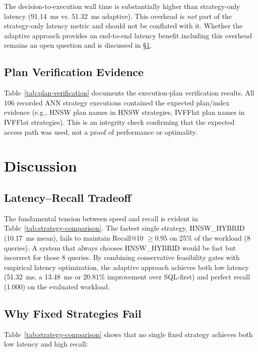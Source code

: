 \documentclass[10pt,twocolumn]{article}
\begin{document}
The decision-to-execution wall time is substantially higher than strategy-only latency (91.14~ms vs. 51.32~ms adaptive). This overhead is \emph{not} part of the strategy-only latency metric and should not be conflated with it. Whether the adaptive approach provides an end-to-end latency benefit including this overhead remains an open question and is discussed in \S\ref{sec:discussion}.



\subsection{Plan Verification Evidence}

Table~\ref{tab:plan-verification} documents the execution-plan verification results. All 106 recorded ANN strategy executions contained the expected plan/index evidence (e.g., HNSW plan names in HNSW strategies, IVFFlat plan names in IVFFlat strategies). This is an integrity check confirming that the expected access path was used, not a proof of performance or optimality.



\section{Discussion}
\label{sec:discussion}

\subsection{Latency--Recall Tradeoff}

The fundamental tension between speed and recall is evident in Table~\ref{tab:strategy-comparison}. The fastest single strategy, HNSW\_HYBRID (10.17~ms mean), fails to maintain Recall@10 $\geq 0.95$ on 25\% of the workload (8 queries). A system that always chooses HNSW\_HYBRID would be fast but incorrect for those 8 queries. By combining conservative feasibility gates with empirical latency optimization, the adaptive approach achieves both low latency (51.32~ms, a 13.48~ms or 20.81\% improvement over SQL-first) and perfect recall (1.000) on the evaluated workload.

\subsection{Why Fixed Strategies Fail}

Table~\ref{tab:strategy-comparison} shows that no single fixed strategy achieves both low latency and high recall:
\end{document}
